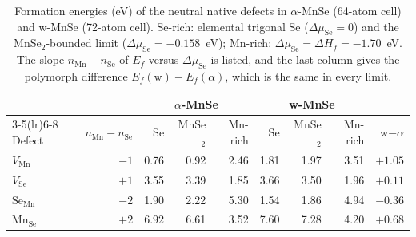 \begin{table}[t]
\centering
\caption{Formation energies (eV) of the neutral native defects in $\alpha$-MnSe (64-atom cell)
and w-MnSe (72-atom cell). Se-rich: elemental trigonal Se ($\Delta\mu_{\mathrm{Se}} = 0$) and the
MnSe$_2$-bounded limit ($\Delta\mu_{\mathrm{Se}} = -0.158$~eV); Mn-rich:
$\Delta\mu_{\mathrm{Se}} = \Delta H_f = -1.70$~eV. The slope
$n_{\mathrm{Mn}} - n_{\mathrm{Se}}$ of $E_f$ versus $\Delta\mu_{\mathrm{Se}}$ is listed, and the
last column gives the polymorph difference $E_f(\mathrm{w}) - E_f(\alpha)$, which is the same in
every limit.}
\label{tab:Ef}
\small\setlength{\tabcolsep}{4pt}
\begin{tabular}{lrrrrrrrr}
\toprule
 & & \multicolumn{3}{c}{$\alpha$-MnSe} & \multicolumn{3}{c}{w-MnSe} & \\
\cmidrule(lr){3-5}\cmidrule(lr){6-8}
Defect & $n_{\mathrm{Mn}}-n_{\mathrm{Se}}$ & Se & MnSe$_2$ & Mn-rich & Se & MnSe$_2$ & Mn-rich & w$-\alpha$ \\
\midrule
$V_{\mathrm{Mn}}$ & $-1$ & 0.76 & 0.92 & 2.46 & 1.81 & 1.97 & 3.51 & $+1.05$ \\
$V_{\mathrm{Se}}$ & $+1$ & 3.55 & 3.39 & 1.85 & 3.66 & 3.50 & 1.96 & $+0.11$ \\
$\mathrm{Se}_{\mathrm{Mn}}$ & $-2$ & 1.90 & 2.22 & 5.30 & 1.54 & 1.86 & 4.94 & $-0.36$ \\
$\mathrm{Mn}_{\mathrm{Se}}$ & $+2$ & 6.92 & 6.61 & 3.52 & 7.60 & 7.28 & 4.20 & $+0.68$ \\
\bottomrule
\end{tabular}
\end{table}
